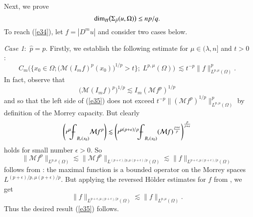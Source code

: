 \documentclass[12pt]{amsart}
\begin{document}
Next, we prove
\begin{equation}\label{e34}
\hbox{dim}_H\big(\Sigma_{\hat{p}}(u,\Omega)\big)\le np/q.
\end{equation}
To reach (\ref{e34}), let $f=|D^m u|$ and consider two cases below.

{\it Case 1}:\ $\hat{p}=p$. Firstly, we establish the following estimate for $\mu\in (\lambda,n]$ and $t>0$:
\begin{equation}\label{e35}
  C_m\big(\{x_0\in\Omega;\big(\mathcal{M}(I_m f)^p(x_0)\big)^{1/p}> t\}; \;L^{p,\mu}(\Omega)\big) \:\lesssim t^{-p}\|f\|_{L^{p,\mu}(\Omega)}^{p}.
  \end{equation}
In fact, observe that
$$
\big(\mathcal{M}(I_{m}f)^p\big)^{1/p} \lesssim I_m (\mathcal{M}f^{p})^{1/p}
$$
 and so that the left side of (\ref{e35}) does not exceed $t^{-p}\|(\mathcal{M}f^{p})^{1/p}\|_{L^{p, \mu}(\Omega)}^{p}$
by definition of the Morrey capacity.  But clearly
$$
  \left( r^\mu {{\mathchoice
{{{\setbox0=\hbox{$\displaystyle{\textstyle{-}}{\int}$ }
\vcenter{\hbox{$\textstyle{-}$ }}\kern-.6\wd0}}}{{{\setbox0=\hbox{$\textstyle{\scriptstyle{-}}{\int}$ }
\vcenter{\hbox{$\scriptstyle{-}$ }}\kern-.6\wd0}}}{{{\setbox0=\hbox{$\scriptstyle{\scriptscriptstyle{-}}{\int}$ }
\vcenter{\hbox{$\scriptscriptstyle{-}$ }}\kern-.6\wd0}}}{{{\setbox0=\hbox{$\scriptscriptstyle{\scriptscriptstyle{-}}{\int}$ }
\vcenter{\hbox{$\scriptscriptstyle{-}$ }}\kern-.6\wd0}}}\!\int}}_{B_r(x_0)} \mathcal{M} f^p \right)
  \lesssim
  \left( r^{\mu(p+\epsilon)/p} {{\mathchoice
{{{\setbox0=\hbox{$\displaystyle{\textstyle{-}}{\int}$ }
\vcenter{\hbox{$\textstyle{-}$ }}\kern-.6\wd0}}}{{{\setbox0=\hbox{$\textstyle{\scriptstyle{-}}{\int}$ }
\vcenter{\hbox{$\scriptstyle{-}$ }}\kern-.6\wd0}}}{{{\setbox0=\hbox{$\scriptstyle{\scriptscriptstyle{-}}{\int}$ }
\vcenter{\hbox{$\scriptscriptstyle{-}$ }}\kern-.6\wd0}}}{{{\setbox0=\hbox{$\scriptscriptstyle{\scriptscriptstyle{-}}{\int}$ }
\vcenter{\hbox{$\scriptscriptstyle{-}$ }}\kern-.6\wd0}}}\!\int}}_{B_r(x_0)} (\mathcal{M}f)^{\frac{p + \epsilon}{p}}\right)^{\frac{p}{p + \epsilon}}
$$
holds for small number $\epsilon>0$. So
$$
\|\mathcal{M} f^{p} \|_{L^{p,\mu}(\Omega)} \lesssim \|\mathcal{M} f^{p}
\|_{L^{(p+\epsilon)/p, \mu(p+\epsilon)/p}(\Omega)}
\lesssim\|f\|_{L^{p+\epsilon, \mu(p + \epsilon)/p}(\Omega)}
$$
follows from \cite{CF1988}: the maximal function is a bounded operator
on the Morrey spaces $L^{(p+\epsilon)/p, \mu(p+\epsilon)/p}$. But
applying the reversed H\"older estimates for $f$ from \cite{ME1975}, we get
$$
\|f\|_{L^{p+\epsilon, \mu(p + \epsilon)/p}(\Omega)}
\lesssim\|f\|_{L^{p, \mu}(\Omega)}.
$$
Thus the desired result (\ref{e35}) follows.
\end{document}
